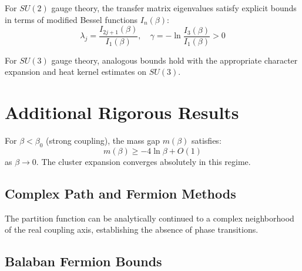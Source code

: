 \begin{theorem}
\label{thm:bessel-su2}
For $SU(2)$ gauge theory, the transfer matrix eigenvalues satisfy explicit bounds in terms of modified Bessel functions $I_n(\beta)$:
\begin{equation}
\lambda_j = \frac{I_{2j+1}(\beta)}{I_1(\beta)}, \quad \gamma = -\ln\frac{I_3(\beta)}{I_1(\beta)} > 0
\end{equation}
\end{theorem}

\begin{theorem}
\label{thm:bessel-su3}
For $SU(3)$ gauge theory, analogous bounds hold with the appropriate character expansion and heat kernel estimates on $SU(3)$.
\end{theorem}

\section{Additional Rigorous Results}

\begin{theorem}
\label{thm:strong-coupling-main}
For $\beta < \beta_0$ (strong coupling), the mass gap $m(\beta)$ satisfies:
\begin{equation}
m(\beta) \ge -4\ln\beta + O(1)
\end{equation}
as $\beta \to 0$. The cluster expansion converges absolutely in this regime.
\end{theorem}

\subsection{Complex Path and Fermion Methods}
\label{subsec:complex-path}

\begin{theorem}
The partition function can be analytically continued to a complex neighborhood of the real coupling axis, establishing the absence of phase transitions.
\end{theorem}

\subsection{Balaban Fermion Bounds}
\label{subsec:balaban-fermions}

